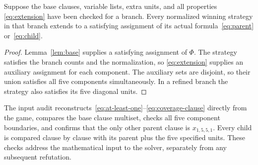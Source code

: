 \begin{proposition}\label{prop:input}
Suppose the base clauses, variable lists, extra units, and all properties
\eqref{eq:extension} have been checked for a branch. Every normalized
winning strategy in that branch extends to a satisfying assignment of
its actual formula~\eqref{eq:parent} or~\eqref{eq:child}.
\end{proposition}
\begin{proof}
Lemma~\ref{lem:base} supplies a satisfying assignment of $\Phi$.
The strategy satisfies the branch counts and the normalization, so
\eqref{eq:extension} supplies an auxiliary assignment for each component.
The auxiliary sets are disjoint, so their union satisfies all five
components simultaneously. In a refined branch the strategy also
satisfies its five diagonal units.
\end{proof}

The input audit reconstructs~\eqref{eq:at-least-one}--\eqref{eq:coverage-clause}
directly from the game, compares the base clause multiset, checks all five
component boundaries, and confirms that the only other parent clause is
$x_{1,5,5,1}$. Every child is compared clause by clause with its parent
plus the five specified units. These checks address the mathematical input
to the solver, separately from any subsequent refutation.

